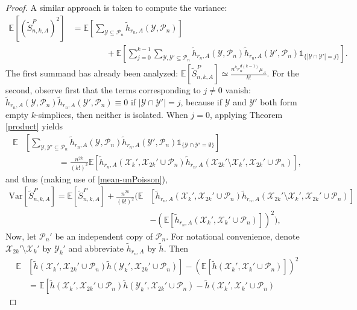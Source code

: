 \documentclass{amsart}
\theoremstyle{definition}
\newcommand{\E}{\mathbb{E}}
\newcommand{\X}{\mathcal{X}}
\newcommand{\Y}{\mathcal{Y}}
\newcommand{\var}{\mathrm{Var}}
\newcommand{\s}{\widetilde{S}}
\newcommand{\p}{\mathcal{P}}
\renewcommand{\1}{\mathbb{1}}
\newcommand{\h}{\tilde{h}}
\begin{document}
\begin{proof}
 A similar approach is taken to compute the variance:
\begin{equation*}\begin{split}
\E\left[(\s_{n,k,A}^P)^2\right]&
=\E\left[\sum_{\Y\subseteq\p_n}\h_{r_n,A}(\Y,\p_n)
\right]\\&\qquad\qquad
+\E\left[\sum_{j=0}^{k-1}\sum_{\Y,\Y'\subseteq\p_n}\h_{r_n,A}(\Y,\p_n)
\h_{r_n,A}(\Y',\p_n)\1_{\{|\Y\cap\Y'|=j\}}\right].
\end{split}\end{equation*}
The first summand has already been analyzed: $\E\left[\s_{n,k,A}^P\right]
\simeq\frac{n^kr_n^{d(k-1)}\mu_A}{k!}$.  
For the second, observe first that the terms corresponding to $j\neq 0$ 
vanish:\\ $\h_{r_n,A}(\Y,\p_n)\h_{r_n,A}(\Y',\p_n)\equiv 0$ if $|\Y\cap\Y'|=j$,
because if $\Y$ and $\Y'$ both form empty $k$-simplices, then neither is
isolated.
When $j=0$, applying Theorem \ref{product} yields
\begin{equation*}\begin{split}
\E&\left[\sum_{\Y,\Y'\subseteq\p_n}\h_{r_n,A}(\Y,\p_n)\h_{r_n,A}
(\Y',\p_n)\1_{\{\Y\cap\Y'=\emptyset\}}
\right]\\&\qquad\qquad
=\frac{n^{2k}}{(k!)^2}\E\left[\h_{r_n,A}(\X_k',\X_{2k}'\cup\p_n)
\h_{r_n,A}(\X_{2k}'\setminus\X_k',\X_{2k}'\cup\p_n)\right],
\end{split}\end{equation*} 
and thus (making use of \eqref{mean-unPoisson}),
\begin{equation*}\begin{split}
\var\left[\s_{n,k,A}^P\right]=\E\left[\s_{n,k,A}^P\right]+\frac{n^{2k}}{(k!)^2}
\Big(\E&\left[\h_{r_n,A}(\X_k',\X_{2k}'\cup\p_n)
\h_{r_n,A}(\X_{2k}'\setminus\X_k',\X_{2k}'\cup\p_n)\right]\\&-\left(\E\left[
\h_{r_n,A}(\X_k',\X_k'\cup\p_n)\right]\right)^2\Big),
\end{split}\end{equation*}
Now, let $\p_n'$ be an independent copy of $\p_n$.  For notational
convenience,
denote $\X_{2k}'\setminus\X_k'$ by $\mathcal{Y}_k'$ and abbreviate
$\h_{r_n,A}$ by $\h$. Then
\begin{equation*}\begin{split}
\E&\left[\h(\X_k',\X_{2k}'\cup\p_n)
\h(\mathcal{Y}_{k}',\X_{2k}'\cup\p_n)\right]-\left(\E\left[
\h(\X_k',\X_k'\cup\p_n)\right]\right)^2\\&=
\E\left[\h(\X_k',\X_{2k}'\cup\p_n)
\h(\mathcal{Y}_{k}',\X_{2k}'\cup\p_n)-\h(\X_k',\X_k'\cup\p_n)

\end{split}
\end{equation*}
\end{proof}
\end{document}
